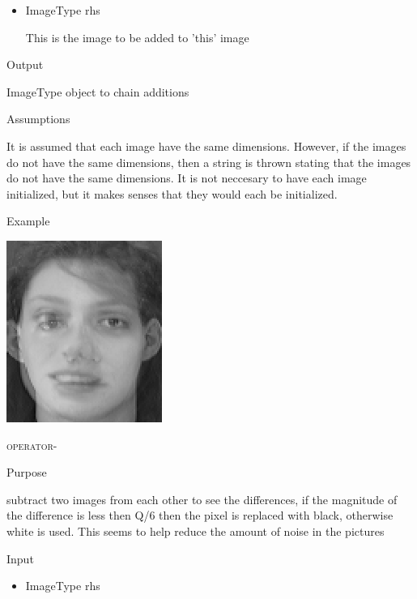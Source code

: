 \documentclass[pdftex, 11pt]{article}
\begin{document}
\begin{description}
\begin{description}
\begin{itemize}
					\item{ImageType rhs}

						This is the image to be added to
						'this' image

				\end{itemize}

			\item{Output}

				ImageType object to chain additions

			\item{Assumptions}

				It is assumed that each image have the same dimensions.
				However, if the images do not have the same dimensions,
				then a string is thrown stating that the images do
				not have the same dimensions. It is not neccesary to have
				each image initialized, but it makes senses
				that they would each be initialized.

			\item{Example}

				\includegraphics{images/outasum.png}

		\end{description}


	\item{\textsc{operator-}}
		\begin{description}
			\item{Purpose}

				subtract two images from each other to see the 
				differences, if the magnitude of
				the difference is less then Q/6 then the pixel
				is replaced with black,	otherwise white is used. 
				This seems to help reduce 
				the amount of noise in the pictures

			\item{Input}

				\begin{itemize}

					\item{ImageType rhs}


\end{itemize}
\end{description}
\end{description}
\end{document}
